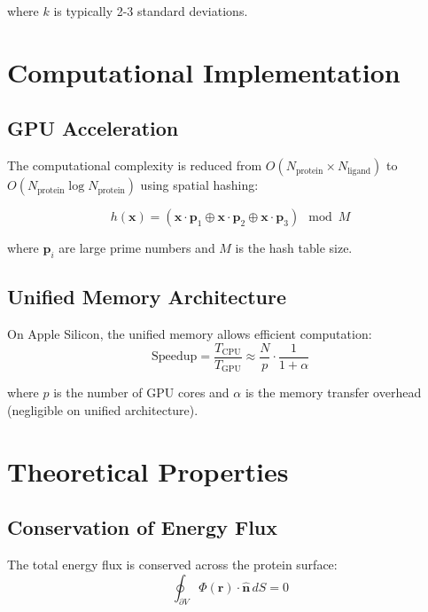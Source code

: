\documentclass{article}
\begin{document}
where $k$ is typically 2-3 standard deviations.

\section{Computational Implementation}

\subsection{GPU Acceleration}

The computational complexity is reduced from $O(N_{\text{protein}} \times N_{\text{ligand}})$ to $O(N_{\text{protein}} \log N_{\text{protein}})$ using spatial hashing:

\begin{equation}
h(\mathbf{x}) = \left(\mathbf{x} \cdot \mathbf{p}_1 \oplus \mathbf{x} \cdot \mathbf{p}_2 \oplus \mathbf{x} \cdot \mathbf{p}_3\right) \mod M
\end{equation}

where $\mathbf{p}_i$ are large prime numbers and $M$ is the hash table size.

\subsection{Unified Memory Architecture}

On Apple Silicon, the unified memory allows efficient computation:
\begin{equation}
\text{Speedup} = \frac{T_{\text{CPU}}}{T_{\text{GPU}}} \approx \frac{N}{p} \cdot \frac{1}{1 + \alpha}
\end{equation}

where $p$ is the number of GPU cores and $\alpha$ is the memory transfer overhead (negligible on unified architecture).

\section{Theoretical Properties}

\subsection{Conservation of Energy Flux}

The total energy flux is conserved across the protein surface:
\begin{equation}
\oint_{\partial V} \Phi(\mathbf{r}) \cdot \hat{\mathbf{n}} \, dS = 0
\end{equation}
\end{document}
